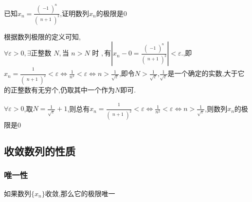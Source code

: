 \documentclass[12pt, a4paper, oneside, UTF8]{ctexbook}  %
\begin{document}
\begin{sloppypar}
    \begin{problem}
    已知$x_{n}=\frac{\left(\begin{array}{c}-1\\\end{array}\right)^{n}}{\left(\begin{array}{c}n+1\\\end{array}\right)^{2}}$,证明数列${x_n}$的极限是$0$
    \end{problem}
    \begin{note}
        根据数列极限的定义可知,$\forall\varepsilon>0,\exists\text{正整数 }N,\text{当 }n{>}N\text{ 时 },\text{有}|x_{n} - 0 =\frac{\left(\begin{array}{c}-1\\\end{array}\right)^{n}}{\left(\begin{array}{c}n+1\\\end{array}\right)^{2}}|<\varepsilon.$,即$x_{n}=\frac{\begin{array}{c}1\\\end{array}}{\left(\begin{array}{c}n+1\\\end{array}\right)^{2}} < \varepsilon \Leftrightarrow \frac{1}{n^2}< \varepsilon \Leftrightarrow n > \frac{1}{\sqrt{\varepsilon}}$,即令$N > \frac{1}{\sqrt{\varepsilon}}$,$\frac{1}{\sqrt{\varepsilon}}$是一个确定的实数,大于它的正整数有无穷个,仍取其中一个作为$N$即可.
    \end{note}
    \begin{solution}
        $\forall \varepsilon>0$,取$N=\frac{1}{\sqrt{\varepsilon}}+1$,则总有$x_{n}=\frac{\begin{array}{c}1\\\end{array}}{\left(\begin{array}{c}n+1\\\end{array}\right)^{2}} < \varepsilon \Leftrightarrow \frac{1}{n^2}< \varepsilon \Leftrightarrow n > \frac{1}{\sqrt{\varepsilon}}$,则数列${x_n}$的极限是$0$
    \end{solution}
    \subsection{收敛数列的性质}
    \subsubsection{唯一性}
    \begin{them}{}{}
        如果数列$\{ x_n \}$收敛,那么它的极限唯一
    \end{them}

\end{sloppypar}
\end{document}
